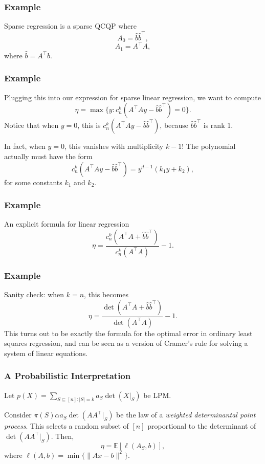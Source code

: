 \documentclass{beamer}
\newcommand{\E}{\mathbb{E}}
\begin{document}
\begin{frame}
    \frametitle{Example}
    Sparse regression is a sparse QCQP where
    \[
        A_0 = \hat{b}\hat{b}^{\intercal},
    \]
    \[
        A_1 = A^{\intercal}A,
    \]
    where $\hat{b} = A^{\intercal}b$.
\end{frame}
\begin{frame}
    \frametitle{Example}
    Plugging this into our expression for sparse linear regression, we want to compute
    \[
        \eta = \max \{y : c_n^k(A^{\intercal}Ay-\hat{b}\hat{b}^{\intercal}) = 0 \}.
    \]
    Notice that when $y = 0$, this is $c_n^k(A^{\intercal}Ay-\hat{b}\hat{b}^{\intercal})$, because $\hat{b}\hat{b}^{\intercal}$ is rank 1.

    \pause
    In fact, when $y=0$, this vanishes with multiplicity $k-1$! The polynomial actually must have the form
    \[
        c_n^k(A^{\intercal}Ay-\hat{b}\hat{b}^{\intercal}) = y^{d-1}(k_1y+k_2),
    \]
    for some constants $k_1$ and $k_2$.

\end{frame}
\begin{frame}
    \frametitle{Example}
    \begin{block}{An explicit formula for linear regression}
        \[
            \eta = \frac{c_n^k(A^{\intercal}A+\hat{b}\hat{b}^{\intercal})}{c_n^k(A^{\intercal}A)} - 1.
        \]
    \end{block}
\end{frame}
\begin{frame}
    \frametitle{Example}
    Sanity check: when $k = n$, this becomes
    \[
        \eta = \frac{\det(A^{\intercal}A+\hat{b}\hat{b}^{\intercal})}{\det(A^{\intercal}A)} - 1.
    \]
    \pause
    This turns out to be exactly the formula for the optimal error in ordinary least squares regression, and can be seen as a version of Cramer's rule for solving a system of linear equations.
\end{frame}
\begin{frame}
    \frametitle{A Probabilistic Interpretation}
    \pause
    Let $p(X) = \sum_{S \subseteq [n] : |S| = k} a_S\det(X|_S)$ be LPM.
    
    \pause
    Consider $\pi(S) \alpha a_S\det(AA^{\intercal}|_S)$ be the law of a \emph{weighted determinantal point process}. This selects a random subset of $[n]$ proportional to the determinant of $\det(AA^{\intercal}|_S)$. Then,
    \[
        \eta = \E[\ell(A_S, b)],
    \]
    where $\ell(A, b) = \min \{\|Ax - b\|^2\}$.
\end{frame}
\end{document}
